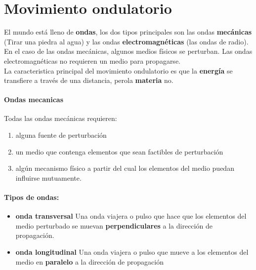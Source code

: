 \documentclass[10pt]{article}
\begin{document}
 
\maketitle

\section{Movimiento ondulatorio}

El mundo está lleno de \textbf{ondas}, los dos tipos principales son las ondas \textbf{mecánicas} 
(Tirar una piedra al agua) y las ondas \textbf{electromagnéticas} (las ondas de radio). En el caso de las 
ondas mecánicas, algunos medios físicos se perturban. Las ondas
electromagnéticas no requieren un medio para propagarse.\\
La caracteristica principal del movimiento ondulatorio es que la \textbf{energía} se 
transfiere a través de una distancia, perola \textbf{materia} no.

\paragraph{Ondas mecanicas}

Todas las ondas mecánicas requieren:

\begin{enumerate}
    \item alguna fuente de perturbación
    \item un medio que contenga elementos que sean factibles de perturbación
    \item algún mecanismo físico a partir del cual los elementos del medio puedan influirse mutuamente.
\end{enumerate}

\paragraph{Tipos de ondas: }

\begin{itemize}
    \item \textbf{onda transversal} Una onda viajera o pulso que hace que los elementos 
    del medio perturbado se muevan \textbf{perpendiculares} a la dirección de propagación.
    \item \textbf{onda longitudinal} Una onda viajera o pulso que mueve a los elementos del medio en \textbf{paralelo}
    a la dirección de propagación
\end{itemize}
\end{document}

